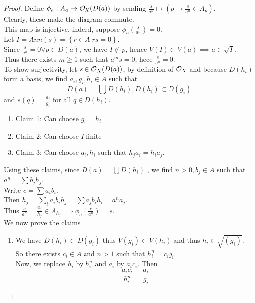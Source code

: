 \documentclass[../main.tex]{subfiles}
\begin{document}
\begin{proof}
Define $\phi_a: A_a \to \mathcal{O}_X( D( a) ) $ by sending $\frac{s}{a^{n}}\mapsto ( p \to \frac{s}{a^{n}}\in A_p) $.\\
Clearly, these make the diagram commute.\\
This map is injective, indeed, suppose $\phi_a( \frac{s}{a^{n}}) =0$.\\
Let $I = Ann( s) = \left\{ r \in A | rs = 0 \right\} $.\\
Since $\frac{s}{a^{n}}= 0 \forall p\in D( a) $, we have $I \not\subset p$, hence $V( I) \subset V( a) \implies a \in \sqrt{I} $.\\
Thus there exists $m \geq 1$ such that $a^{m}s = 0$, hece $\frac{s}{a^{n}}=0$.\\
To show surjectivity, let $s\in \mathcal{O}_X( D( a) ) $, by definition of $\mathcal{O}_X$ and because $D( h_i) $ form a basis, we find $a_i, g_i, h_i \in A$ such that
\[ 
D( a) = \bigcup D( h_i) , D( h_i) \subset D( g_i ) 
\]
and $s( q) = \frac{a_i }{g_i}$ for all $q \in D( h_i) $.\\
\begin{enumerate}
\item Claim 1: Can choose $g_i = h_i$ 
\item Claim 2: Can choose $I $ finite
\item Claim 3: Can choose $a_i, h_i$ such that $h_j a_i = h_i a_j$.\\
\end{enumerate}
Using these claims, since $D( a) = \bigcup D( h_i)$ , we find $n>0,b_j \in A$ such that $a^{n}= \sum b_j h_j $.\\
Write $c= \sum a_i b_i$.\\
Then $h_j = \sum_i a_i b_i h_j = \sum a_j b_i h_i = a^{n}a_j $.\\
Thus $\frac{c}{a^{n}}= \frac{a_j }{h_j }\in A_{h_j }\implies \phi_a ( \frac{c}{a^{n}}) =s  $.\\
We now prove the claims
\begin{enumerate}
\item We have $D( h_i) \subset D( g_i)  $ thus $V( g_i) \subset V( h_i) $ and thus $h_i \in \sqrt{( g_i) } $.\\
	So there exists $c_i \in A$ and $n>1$ such that $h_i^{n}=c_i g_i$.\\
	Now, we replace $h_i$ by $h_i^{n}$ and $a_i$ by $a_i c_i$. Then
	\[ 
	\frac{a_i c_i}{h_i ^{n}}= \frac{a_i}{g_i}
	\]


\end{enumerate}
\end{proof}
\end{document}
